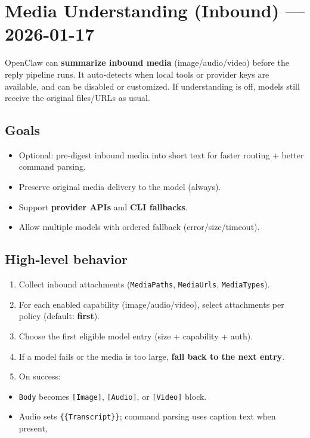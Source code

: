 \clearpage

\section{Media Understanding (Inbound) — 2026-01-17}


OpenClaw can \textbf{summarize inbound media} (image/audio/video) before the reply pipeline runs. It auto‑detects when local tools or provider keys are available, and can be disabled or customized. If understanding is off, models still receive the original files/URLs as usual.

\subsection{Goals}


\begin{itemize}
  \item Optional: pre‑digest inbound media into short text for faster routing + better command parsing.
  \item Preserve original media delivery to the model (always).
  \item Support \textbf{provider APIs} and \textbf{CLI fallbacks}.
  \item Allow multiple models with ordered fallback (error/size/timeout).
\end{itemize}


\subsection{High‑level behavior}


\begin{enumerate}
  \item Collect inbound attachments (\texttt{MediaPaths}, \texttt{MediaUrls}, \texttt{MediaTypes}).
  \item For each enabled capability (image/audio/video), select attachments per policy (default: \textbf{first}).
  \item Choose the first eligible model entry (size + capability + auth).
  \item If a model fails or the media is too large, \textbf{fall back to the next entry}.
  \item On success:
\end{enumerate}

\begin{itemize}
  \item \texttt{Body} becomes \texttt{[Image]}, \texttt{[Audio]}, or \texttt{[Video]} block.
  \item Audio sets \texttt{\{\{Transcript\}\}}; command parsing uses caption text when present,
\end{itemize}

